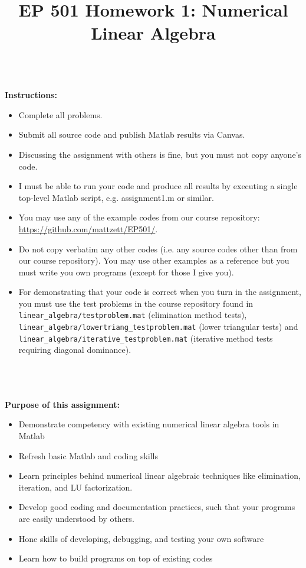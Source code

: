 \documentclass{article}
\begin{document}
\title{EP 501 Homework 1:  Numerical Linear Algebra}

\maketitle

~\\
\textbf{Instructions:}  
\begin{itemize}
  \item Complete all problems.
  \item Submit all source code and publish Matlab results via Canvas.  
  \item Discussing the assignment with others is fine, but you must not copy anyone's code.  
  \item I must be able to run your code and produce all results by executing a single top-level Matlab script, e.g. \textsf{assignment1.m} or similar.  
  \item You may use any of the example codes from our course repository:  \url{https://github.com/mattzett/EP501/}.
  \item Do not copy verbatim any other codes (i.e. any source codes other than from our course repository).  You may use other examples as a reference but you must write you own programs (except for those I give you).  
  \item For demonstrating that your code is correct when you turn in the assignment, you must use the test problems in the course repository found in \texttt{linear\_algebra/testproblem.mat} (elimination method tests), \texttt{linear\_algebra/lowertriang\_testproblem.mat} (lower triangular tests) and \\ \texttt{linear\_algebra/iterative\_testproblem.mat} (iterative method tests requiring diagonal dominance).  
\end{itemize}
~\\~\\~\\
\textbf{Purpose of this assignment:}  
\begin{itemize}
  \item Demonstrate competency with existing numerical linear algebra tools in Matlab
  \item Refresh basic Matlab and coding skills
  \item Learn principles behind numerical linear algebraic techniques like elimination, iteration, and LU factorization.  
  \item Develop good coding and documentation practices, such that your programs are easily understood by others.  
  \item Hone skills of developing, debugging, and testing your own software
  \item Learn how to build programs on top of existing codes
\end{itemize}
\end{document}
